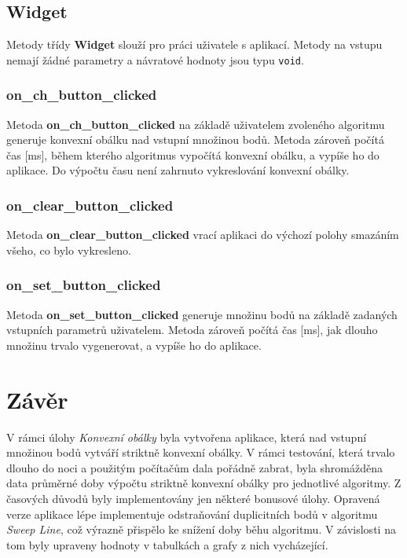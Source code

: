 \documentclass[a4paper, 12pt]{article}
\begin{document}
\subsection{Widget}
Metody třídy \textbf{Widget} slouží pro práci uživatele s aplikací. Metody na vstupu nemají žádné parametry a návratové hodnoty jsou typu \texttt{void}.

\subsubsection*{on\_ch\_button\_clicked}
Metoda \textbf{on\_ch\_button\_clicked} na základě uživatelem zvoleného algoritmu generuje konvexní obálku nad vstupní množinou bodů. Metoda zároveň počítá čas [ms], během kterého algoritmus vypočítá konvexní obálku, a vypíše ho do aplikace. Do výpočtu času není zahrnuto vykreslování konvexní obálky.

\subsubsection*{on\_clear\_button\_clicked}
Metoda \textbf{on\_clear\_button\_clicked} vrací aplikaci do výchozí polohy smazáním všeho, co bylo vykresleno. 

\subsubsection*{on\_set\_button\_clicked}
Metoda \textbf{on\_set\_button\_clicked} generuje množinu bodů na základě zadaných vstupních parametrů uživatelem. Metoda zároveň počítá čas [ms], jak dlouho množinu trvalo vygenerovat, a vypíše ho do aplikace.

\clearpage
\section{Závěr}
V rámci úlohy \textit{Konvexní obálky} byla vytvořena aplikace, která nad vstupní množinou bodů vytváří striktně konvexní obálky. V rámci testování, která trvalo dlouho do noci a použitým počítačům dala pořádně zabrat, byla shromážděna data průměrné doby výpočtu striktně konvexní obálky pro jednotlivé algoritmy. Z časových důvodů byly implementovány jen některé bonusové úlohy. Opravená verze aplikace lépe implementuje odstraňo\-vá\-ní duplicitních bodů v algoritmu \textit{Sweep Line}, což výrazně přispělo ke snížení doby běhu algoritmu. V závislosti na tom byly upraveny hodnoty v tabulkách a grafy z nich vycházející.\\
\end{document}
